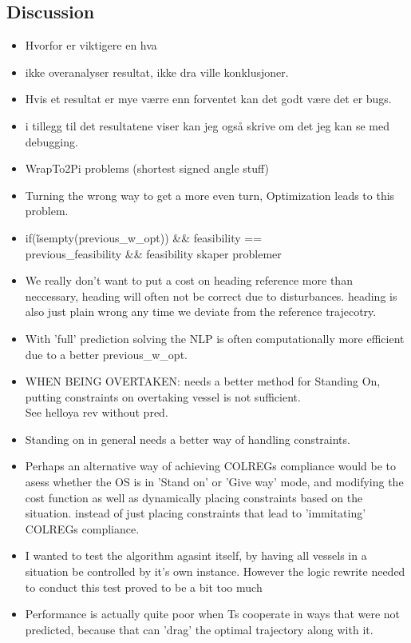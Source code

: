 \subsection{Discussion}
\begin{itemize}
    \item Hvorfor er viktigere en hva
    \item ikke overanalyser resultat, ikke dra ville konklusjoner.
    \item Hvis et resultat er mye værre enn forventet kan det godt være det er bugs.
    \item i tillegg til det resultatene viser kan jeg også skrive om det jeg kan se med debugging.
    \item WrapTo2Pi problems (shortest signed angle stuff)
    \item Turning the wrong way to get a more even turn, Optimization leads to this problem. 
    \item if(\~isempty(previous\_w\_opt)) \&\& feasibility == \\
     previous\_feasibility \&\& feasibility     skaper problemer 
    \item We really don't want to put a cost on heading reference more than neccessary, heading will often not be correct due to disturbances.
    heading is also just plain wrong any time we deviate from the reference trajecotry.
    \item With 'full' prediction solving the NLP is often computationally more efficient due to a better previous\_w\_opt.
    \item WHEN BEING OVERTAKEN: needs a better method for Standing On, putting constraints on overtaking vessel is not sufficient. \\
    See helloya rev without pred.
    \item Standing on in general needs a better way of handling constraints.
    \item Perhaps an alternative way of achieving COLREGs compliance would be to asess whether the \gls{OS} is in 'Stand on' or
    'Give way' mode, and modifying the cost function as well as dynamically placing constraints based on the situation. instead of
    just placing constraints that lead to 'immitating' COLREGs compliance.
    \item I wanted to test the algorithm agasint itself, by having all vessels in a situation be controlled by it's own instance.
    However the logic rewrite needed to conduct this test proved to be a bit too much
    \item Performance is actually quite poor when \gls{Ts} cooperate in ways that were not predicted, because
    that can 'drag' the optimal trajectory along with it.
\end{itemize}

